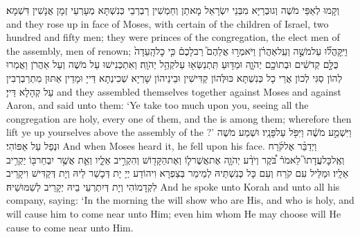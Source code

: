 {וְקָמוּ לְאַפֵּי מֹשֶׁה וְגוּבְרַיָּא מִבְּנֵי יִשְׂרָאֵל מָאתַן וְחַמְשִׁין רַבְרְבֵי כְּנִשְׁתָּא מְעָרְעֵי זְמָן אֲנָשִׁין דִּשְׁמָא׃}
{and they rose up in face of Moses, with certain of the children of Israel, two hundred and fifty men; they were princes of the congregation, the elect men of the assembly, men of renown;}{}
{וַיִּֽקָּהֲל֞וּ עַל\maqqaf מֹשֶׁ֣ה וְעַֽל\maqqaf אַהֲרֹ֗ן וַיֹּאמְר֣וּ אֲלֵהֶם֮ רַב\maqqaf לָכֶם֒ כִּ֤י כׇל\maqqaf הָֽעֵדָה֙ כֻּלָּ֣ם קְדֹשִׁ֔ים וּבְתוֹכָ֖ם יְהֹוָ֑ה וּמַדּ֥וּעַ תִּֽתְנַשְּׂא֖וּ עַל\maqqaf קְהַ֥ל יְהֹוָֽה׃}
{וְאִתְכְּנִישׁוּ עַל מֹשֶׁה וְעַל אַהֲרֹן וַאֲמַרוּ לְהוֹן סַגִּי לְכוֹן אֲרֵי כָל כְּנִשְׁתָּא כּוּלְּהוֹן קַדִּישִׁין וּבֵינֵיהוֹן שָׁרְיָא שְׁכִינְתָא דַּייָ וּמָדֵין אַתּוּן מִתְרַבְרְבִין עַל קְהָלָא דַּייָ׃}
{and they assembled themselves together against Moses and against Aaron, and said unto them: ‘Ye take too much upon you, seeing all the congregation are holy, every one of them, and the \lord\space is among them; wherefore then lift ye up yourselves above the assembly of the \lord?’}{}
{וַיִּשְׁמַ֣ע מֹשֶׁ֔ה וַיִּפֹּ֖ל עַל\maqqaf פָּנָֽיו׃}
{וּשְׁמַע מֹשֶׁה וּנְפַל עַל אַפּוֹהִי׃}
{And when Moses heard it, he fell upon his face.}{}
{וַיְדַבֵּ֨ר אֶל\maqqaf קֹ֜רַח וְאֶֽל\maqqaf כׇּל\maqqaf עֲדָתוֹ֮ לֵאמֹר֒ בֹּ֠קֶר וְיֹדַ֨ע יְהֹוָ֧ה אֶת\maqqaf אֲשֶׁר\maqqaf ל֛וֹ וְאֶת\maqqaf הַקָּד֖וֹשׁ וְהִקְרִ֣יב אֵלָ֑יו וְאֵ֛ת אֲשֶׁ֥ר יִבְחַר\maqqaf בּ֖וֹ יַקְרִ֥יב אֵלָֽיו׃}
{וּמַלֵּיל עִם קֹרַח וְעִם כָּל כְּנִשְׁתֵּיהּ לְמֵימַר בְּצַפְרָא וִיהוֹדַע יְיָ יָת דְּכָשַׁר לֵיהּ וְיָת דְּקַדִּישׁ וִיקָרֵיב לִקְדָמוֹהִי וְיָת דְּיִתְרְעֵי בֵיהּ יְקָרֵיב לְשִׁמּוּשֵׁיהּ׃}
{And he spoke unto Korah and unto all his company, saying: ‘In the morning the \lord\space will show who are His, and who is holy, and will cause him to come near unto Him; even him whom He may choose will He cause to come near unto Him.}{}
